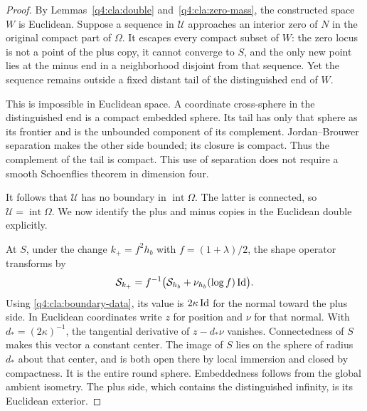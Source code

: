 \begin{proof}
By Lemmas~\ref{q4:cla:double} and~\ref{q4:cla:zero-mass}, the constructed
space $W$ is Euclidean.  Suppose a sequence in $\mathcal U$ approaches
an interior zero of $N$ in the original compact part of $\Omega$.
It escapes every compact subset of $W$: the zero locus is not a
point of the plus copy, it cannot converge to $S$, and the only
new point lies at the minus end in a neighborhood disjoint from
that sequence.  Yet the sequence remains outside a fixed distant
tail of the distinguished end of $W$.

This is impossible in Euclidean space.  A coordinate cross-sphere
in the distinguished end is a compact embedded sphere.  Its tail
has only that sphere as its frontier and is the unbounded component
of its complement.  Jordan--Brouwer separation makes the other
side bounded; its closure is compact.  Thus the complement of the
tail is compact.  This use of separation does not require a smooth
Schoenflies theorem in dimension four.

It follows that $\mathcal U$ has no boundary in
$\operatorname{int}\Omega$.  The latter is connected, so
$\mathcal U=\operatorname{int}\Omega$.  We now identify the plus
and minus copies in the Euclidean double explicitly.

At $S$, under the change $k_+=f^2h_b$ with
$f=(1+\lambda)/2$, the shape operator transforms by
\[
 \mathcal S_{k_+}
       =f^{-1}\bigl(\mathcal S_{h_b}
                   +\nu_{h_b}(\log f)\operatorname{Id}\bigr).
\]
Using \eqref{q4:cla:boundary-data}, its value is $2\kappa\operatorname{Id}$ for
the normal toward the plus side.  In Euclidean coordinates write
$z$ for position and $\nu$ for that normal.  With
$d_*=(2\kappa)^{-1}$, the tangential derivative of $z-d_*\nu$
vanishes.  Connectedness of $S$ makes this vector a constant center.
The image of $S$ lies on the sphere of radius $d_*$ about that
center, and is both open there by local immersion and closed by
compactness.  It is the entire round sphere.  Embeddedness follows
from the global ambient isometry.  The plus side, which contains
the distinguished infinity, is its Euclidean exterior.


\end{proof}
